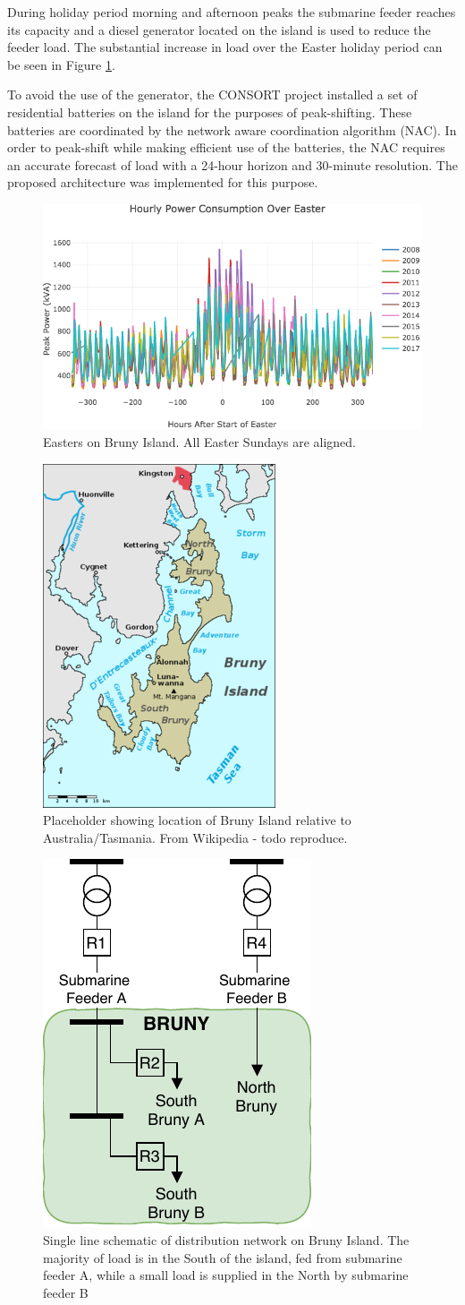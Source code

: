 \documentclass[conference]{IEEEtran}
\begin{document}
During holiday period morning and afternoon peaks the submarine feeder reaches its capacity and a diesel generator located on the island is used to reduce the feeder load.
The substantial increase in load over the Easter holiday period can be seen in Figure \ref{fig:bruny_easter}.

To avoid the use of the generator, the CONSORT project installed a set of residential batteries on the island for the purposes of peak-shifting.
These batteries are coordinated by the network aware coordination algorithm (NAC).
In order to peak-shift while making efficient use of the batteries, the NAC requires an accurate forecast of load with a 24-hour horizon and 30-minute resolution.
The proposed architecture was implemented for this purpose.

\begin{figure}[htbp]
	\centerline{\includegraphics[width=.35\textwidth]{images/easter_bruny.png}}
	\caption{Easters on Bruny Island. All Easter Sundays are aligned.}
	\label{fig:bruny_easter}
\end{figure}

\begin{figure}[htbp]
	\centerline{\includegraphics[width=.35\textwidth]{images/bruny_island_map.png}}
	\caption{Placeholder showing location of Bruny Island relative to Australia/Tasmania. From Wikipedia - todo reproduce.}
	\label{fig:bruny_map}
\end{figure}

\begin{figure}[htbp]
	\centerline{\includegraphics[width=.2\textwidth]{images/bruny_single_line.pdf}}
	\caption{Single line schematic of distribution network on Bruny Island.
			 The majority of load is in the South of the island, fed from submarine feeder A, while a small load is supplied in the North by submarine feeder B}
	\label{fig:bruny_network}
\end{figure}
\end{document}
